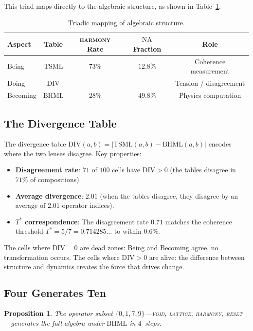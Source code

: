 \documentclass[11pt,a4paper]{article}
\newtheorem{proposition}[theorem]{Proposition}
\theoremstyle{definition}
\theoremstyle{remark}
\newcommand{\NA}{\mathrm{NA}}
\newcommand{\DIV}{\mathrm{DIV}}
\newcommand{\TSML}{\mathrm{TSML}}
\newcommand{\BHML}{\mathrm{BHML}}
\newcommand{\Tstar}{T^{*}}
\begin{document}
This triad maps directly to the algebraic structure, as shown in Table~\ref{tab:triad}.

\begin{table}[ht]
\centering
\caption{Triadic mapping of algebraic structure.}\label{tab:triad}
\begin{tabular}{lcccc}
\toprule
Aspect & Table & \textsc{harmony} Rate & $\NA$ Fraction & Role \\
\midrule
Being    & $\TSML$ & $73\%$ & $12.8\%$ & Coherence measurement \\
Doing    & $\DIV$  & ---    & ---      & Tension / disagreement \\
Becoming & $\BHML$ & $28\%$ & $49.8\%$ & Physics computation \\
\bottomrule
\end{tabular}
\end{table}

\subsection{The Divergence Table}\label{sec:div-table}

The divergence table $\DIV(a,b)=|\TSML(a,b)-\BHML(a,b)|$ encodes where the two lenses disagree. Key properties:
\begin{itemize}
\item \textbf{Disagreement rate}: $71$ of $100$ cells have $\DIV>0$ (the tables disagree in $71\%$ of compositions).
\item \textbf{Average divergence}: $2.01$ (when the tables disagree, they disagree by an average of $2.01$ operator indices).
\item \textbf{$\Tstar$ correspondence}: The disagreement rate $0.71$ matches the coherence threshold $\Tstar=5/7=0.714285\ldots$ to within $0.6\%$.
\end{itemize}

The cells where $\DIV=0$ are dead zones: Being and Becoming agree, no transformation occurs. The cells where $\DIV>0$ are alive: the difference between structure and dynamics creates the force that drives change.

\subsection{Four Generates Ten}\label{sec:four-ten}

\begin{proposition}\label{prop:four-gen}
The operator subset $\{0,1,7,9\}$---\textsc{void}, \textsc{lattice}, \textsc{harmony}, \textsc{reset}---generates the full algebra under $\BHML$ in $4$~steps.
\end{proposition}
\end{document}
